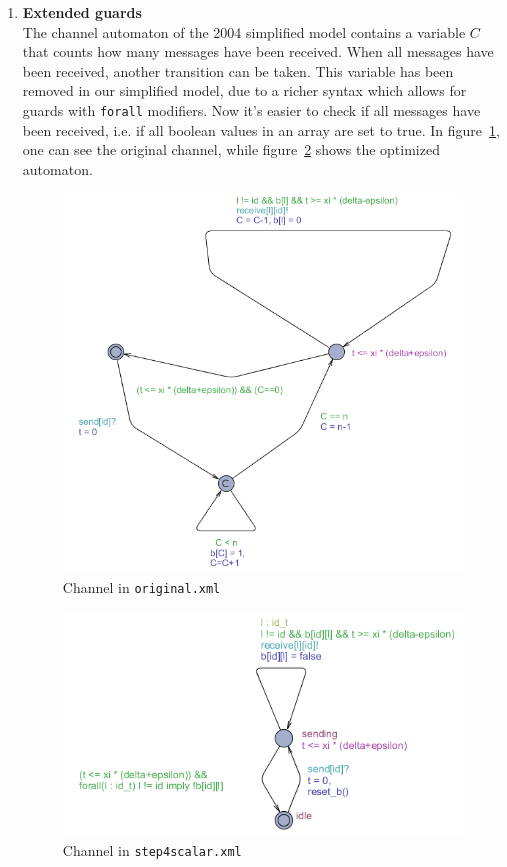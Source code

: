 \documentclass[a4paper,10pt]{article}
\newcommand{\oldsimple}{2004 simplified model\xspace}
\newcommand{\newsimple}{our simplified model\xspace}
\begin{document}
\begin{enumerate}
\item \textbf{Extended guards} \\
	The channel automaton of the \oldsimple contains a variable \(C\) that counts how many messages have been received. When all messages have been received, another transition can be taken. This variable has been removed in \newsimple, due to a richer syntax which allows for guards with \texttt{forall} modifiers. Now it's easier to check if all messages have been received, i.e. if all boolean values in an array are set to true. In figure~\ref{fig:original_channel}, one can see the original channel, while figure~\ref{fig:step4scalar_channel} shows the optimized automaton.

\begin{figure}[!h]
\includegraphics[scale=0.7]{original_channel}
\caption{Channel in \texttt{original.xml}\label{fig:original_channel}}
\end{figure}

\begin{figure}[!h]
\includegraphics{step4scalar_channel}
\caption{Channel in \texttt{step4scalar.xml}\label{fig:step4scalar_channel}}
\end{figure}

\end{enumerate}
\end{document}
